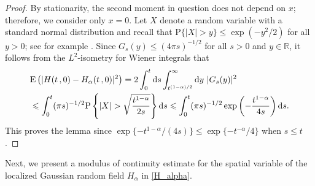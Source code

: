 \documentclass[reqno]{amsart}
\newcommand{\<}{\langle}
\renewcommand{\>}{\rangle}
\newcommand{\R}{\mathbb{R}}
\renewcommand{\P}{\mathrm{P}}
\newcommand{\E}{\mathrm{E}}
\newcommand{\1}{\mathbb{1}}
\renewcommand{\d}{{\rm d}}
\renewcommand{\le}{\leqslant}
\theoremstyle{definition}
\numberwithin{equation}{section}
\begin{document}
\begin{proof}
	By stationarity, the second moment in question does not depend on $x$;
	therefore, we consider only $x=0$. 
	Let $X$ denote a random variable with a standard normal distribution
	and recall that $\P\{|X|>y\}\le\exp(-y^2/2)$ for all $y>0$; see for example 
	\cite[Lemma A.3]{CBMS}.
	Since $G_s(y)\le  (4\pi s)^{-1/2}$ for all $s>0$ and $y\in\R$,
	it follows from the $L^2$-isometry for Wiener integrals that
	\begin{align*}
		& \E\left( |H(t\,,0)-H_\alpha(t\,,0)|^2\right)
			=  2\int_0^t\d s\int_{t^{(1-\alpha)/2}}^\infty\d y\
			|G_s(y)|^2\\
		& \le\int_0^t (\pi s)^{-1/2}\P\left\{ |X| > \sqrt{\frac{t^{1-\alpha}}{2s}} \right\}\d s
			\le\int_0^t (\pi s)^{-1/2}\exp\left(-\frac{t^{1-\alpha}}{4s}\right)\d s.
	\end{align*}
	This proves the lemma since $\exp\{-t^{1-\alpha}/(4s)\} \le\exp\{-t^{-\alpha}/4\}$ when $s\le t$.
\end{proof}

Next, we present a modulus of continuity estimate for the spatial variable of
the localized Gaussian random
field $H_\alpha$ in \eqref{H_alpha}.
\end{document}
